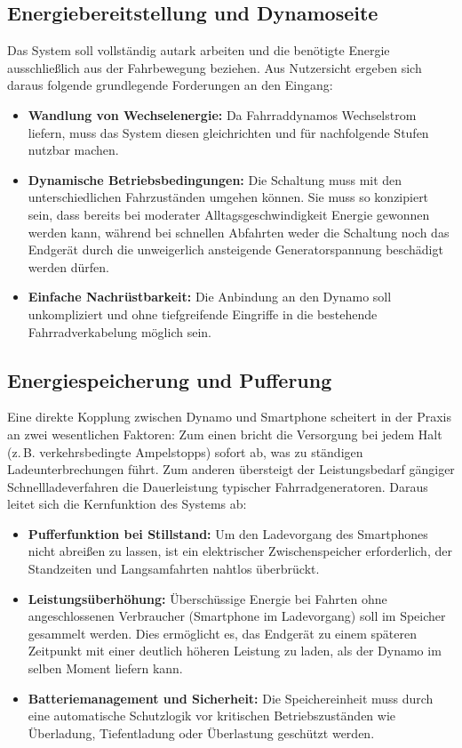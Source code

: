 \documentclass[12pt,a4paper]{article}
\begin{document}
\subsection{Energiebereitstellung und Dynamoseite}
Das System soll vollständig autark arbeiten und die benötigte Energie ausschließlich aus der Fahrbewegung beziehen. 
Aus Nutzersicht ergeben sich daraus folgende grundlegende Forderungen an den Eingang:
\begin{itemize}
    \item \textbf{Wandlung von Wechselenergie:} 
    Da Fahrraddynamos Wechselstrom liefern, muss das System diesen gleichrichten 
    und für nachfolgende Stufen nutzbar machen.
    \item \textbf{Dynamische Betriebsbedingungen:} 
    Die Schaltung muss mit den unterschiedlichen Fahrzuständen umgehen können. Sie muss so konzipiert sein, 
    dass bereits bei moderater Alltagsgeschwindigkeit Energie gewonnen werden kann, während bei schnellen 
    Abfahrten weder die Schaltung noch das Endgerät durch die unweigerlich ansteigende Generatorspannung beschädigt werden dürfen.
    \item \textbf{Einfache Nachrüstbarkeit:} 
    Die Anbindung an den Dynamo soll unkompliziert und ohne tiefgreifende Eingriffe in die bestehende Fahrradverkabelung möglich sein.
\end{itemize}

\subsection{Energiespeicherung und Pufferung}
Eine direkte Kopplung zwischen Dynamo und Smartphone scheitert in der Praxis an zwei wesentlichen Faktoren: 
Zum einen bricht die Versorgung bei jedem Halt (z.\,B. verkehrsbedingte Ampelstopps) sofort ab, was zu ständigen 
Ladeunterbrechungen führt. Zum anderen übersteigt der Leistungsbedarf gängiger Schnellladeverfahren die Dauerleistung typischer Fahrradgeneratoren.
Daraus leitet sich die Kernfunktion des Systems ab:
\begin{itemize}
    \item \textbf{Pufferfunktion bei Stillstand:} 
    Um den Ladevorgang des Smartphones nicht abreißen zu lassen, ist ein elektrischer Zwischenspeicher 
    erforderlich, der Standzeiten und Langsamfahrten nahtlos überbrückt.
    \item \textbf{Leistungsüberhöhung:} 
    Überschüssige Energie bei Fahrten ohne angeschlossenen Verbraucher (Smartphone im Ladevorgang) soll im Speicher gesammelt werden. 
    Dies ermöglicht es, das Endgerät zu einem späteren Zeitpunkt mit einer deutlich höheren Leistung zu laden, 
    als der Dynamo im selben Moment liefern kann.
    \item \textbf{Batteriemanagement und Sicherheit:} 
    Die Speichereinheit muss durch eine automatische Schutzlogik vor kritischen Betriebszuständen wie Überladung, 
    Tiefentladung oder Überlastung geschützt werden.
\end{itemize}
\end{document}
